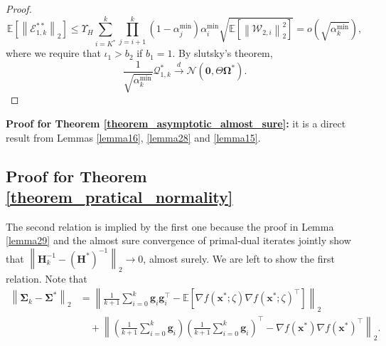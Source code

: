 \documentclass[aos]{imsart}
\numberwithin{equation}{section}
\theoremstyle{plain}
\begin{document}
\begin{appendix}
\begin{proof}
    \begin{equation*}
        \mathbb{E} \left[ \left\| \mathcal{E}_{1,k}^{**} \right\|_2 \right] \leq \Upsilon_{H} \sum_{i=K^{*}}^{k} \prod_{j=i+1}^{k} (1-\alpha^{\min}_j) \alpha^{\min}_i  \sqrt{   \mathbb{E} \left[ \left\| \mathcal{W}_{2,i} \right\|_2^2 \right]} = o\left( \sqrt{\alpha^{\min}_k} \right),
    \end{equation*}
    where we require that $\iota_1 >b_2$ if $b_1 = 1$. By slutsky's theorem,  
    \begin{equation*}
        \frac{1}{\sqrt{\alpha^{\min}_k}} \mathcal{Q}_{1,k}^{*}  \stackrel{d}{\longrightarrow} \mathcal{N} \left( \bm{0}, \Theta \bm{\Omega}^{*} \right).
    \end{equation*}
    \end{proof}


\textbf{Proof for Theorem \ref{theorem_asymptotic_almost_sure}:}  it is a direct result from Lemmas \ref{lemma16}, \ref{lemma28} and \ref{lemma15}.

\subsection{Proof for Theorem \ref{theorem_pratical_normality}}
\label{sec:appendix3.4}
The second relation is implied by the first one because the proof in Lemma \ref{lemma29} and the almost sure convergence of primal-dual iterates jointly show that $\left\|\bm{H}_k^{-1} - \left(\bm{H}^{*}\right)^{-1} \right\|_2 \to 0$, almost surely. We are left to show the first relation. Note that
    \begin{equation*}
        \begin{split}
             \left\| \bm{\Sigma}_{k} - \bm{\Sigma}^{*} \right\|_2 & = \left\|  \frac{1}{k+1}\sum_{i=0}^{k} \bm{g}_i  \bm{g}_i^{\top} - \mathbb{E} \left[ \nabla f(\bm{x}^{*};\zeta)   \nabla f(\bm{x}^{*};\zeta)^{\top} \right]\right\|_2 \\
             & \hspace{1em} + \left\| \left( \frac{1}{k+1}\sum_{i=0}^{k} \bm{g}_i\right)\left( \frac{1}{k+1}\sum_{i=0}^{k} \bm{g}_i\right)^{\top} - \nabla f(\bm{x}^{*})\nabla f(\bm{x}^{*})^{\top}\right\|_2.
        \end{split}
    \end{equation*}


\end{appendix}
\end{document}
